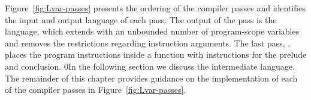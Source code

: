 \documentclass[7x10,nocrop]{TimesAPriori_MIT}%
\def\racketEd{0}
\def\edition{1}
\newcommand{\racket}[1]{{\if\edition\racketEd{#1}\fi}}
\begin{document}
Figure~\ref{fig:Lvar-passes} presents the ordering of the compiler
passes and identifies the input and output language of each pass.
%
The output of the  pass is the \LangXVar{}
language, which extends \LangXInt{} with an unbounded number of
program-scope variables and removes the restrictions regarding
instruction arguments.
%
The last pass, , places the program
instructions inside a  function with instructions for the
prelude and conclusion.
%
\racket{In the following section we discuss the \LangCVar{}
  intermediate language.}
%
The remainder of this chapter provides guidance on the implementation
of each of the compiler passes in Figure~\ref{fig:Lvar-passes}.



\newcommand{\CvarGrammarRacket}{
\begin{array}{lcl}
\Atm &::=& \Int \MID \Var \\
\Exp &::=& \Atm \MID \CREAD{} \MID \CNEG{\Atm} \MID \CADD{\Atm}{\Atm} \MID \CSUB{\Atm}{\Atm}\\
\Stmt &::=& \CASSIGN{\Var}{\Exp} \\
\Tail &::= & \CRETURN{\Exp} \MID \Stmt~\Tail 
\end{array}
}
\newcommand{\CvarASTRacket}{
\begin{array}{lcl}
\Atm &::=& \INT{\Int} \MID \VAR{\Var} \\
\Exp &::=& \Atm \MID \READ{} \MID \NEG{\Atm} \\
 &\MID& \ADD{\Atm}{\Atm} \MID \SUB{\Atm}{\Atm}\\
\Stmt &::=& \ASSIGN{\VAR{\Var}}{\Exp} \\
\Tail &::= & \RETURN{\Exp} \MID \SEQ{\Stmt}{\Tail} 
\end{array}
}
\end{document}
